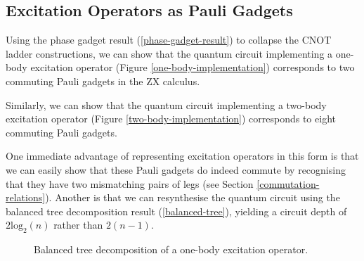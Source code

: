 
\subsection{Excitation Operators as Pauli Gadgets}%
\label{excitation-operators-pauli-gadgets}

Using the phase gadget result (\ref{phase-gadget-result}) to collapse the CNOT ladder constructions, we can show that the quantum circuit implementing a one-body excitation operator (Figure \ref{one-body-implementation}) corresponds to two commuting Pauli gadgets in the ZX calculus.


Similarly, we can show that the quantum circuit implementing a two-body excitation operator (Figure \ref{two-body-implementation}) corresponds to eight commuting Pauli gadgets.


One immediate advantage of representing excitation operators in this form is that we can easily show that these Pauli gadgets do indeed commute by recognising that they have two mismatching pairs of legs (see Section \ref{commutation-relations}). Another is that we can resynthesise the quantum circuit using the balanced tree decomposition result (\ref{balanced-tree}), yielding a circuit depth of $2\text{log}_2(n)$ rather than $2(n-1)$.

\begin{figure}[H]
    \centering
    \caption{Balanced tree decomposition of a one-body excitation operator.}
\end{figure}
